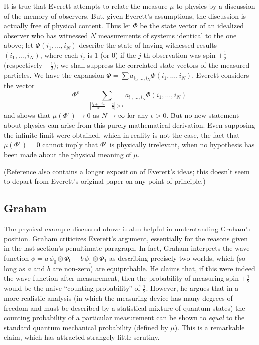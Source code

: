 \documentclass[aps,pra,12pt]{revtex4}
\begin{document}
It is true that Everett attempts to relate the measure $\mu$ to physics by a
discussion of the memory of observers. 
But, given Everett's assumptions, the discussion
is actually free of physical content. 
Thus let $\Phi$ be the state vector of an idealized observer who has witnessed
$N$ measurements of systems identical to the one above; 
let $\Phi (i_1 , \ldots , i_N )$ describe the state of having witnessed
results $(i_1 , \ldots , i_N )$, where each $i_j$ is $1$ (or $0$) if the 
$j$-th observation was spin $+\frac{1}{2}$ (respectively 
$-\frac{1}{2}$); we shall 
suppress the correlated state vectors of the measured particles. 
We have the expansion 
$\Phi = \sum  a_{i_1 , \ldots , i_N}\Phi (i_1 , \ldots , i_N )$.
Everett considers the vector
\begin{equation}
\Phi^{\epsilon} = 
\sum_{| \frac{i_1 + \ldots i_N}{N} - \frac{2}{3} | > \epsilon}
 a_{i_1 , \ldots , i_N}\Phi (i_1 , \ldots , i_N )
\end{equation}
and shows that $\mu(\Phi^{\epsilon}) \rightarrow 0$ as $N \rightarrow \infty$
for any $\epsilon > 0$. 
But no new statement about physics can arise from this purely mathematical
derivation.  
Even supposing the infinite limit were obtained, which in reality is not
the case, the fact that
$\mu (\Phi^{\epsilon})=0 $ cannot imply that $\Phi^{\epsilon}$ is
physically irrelevant, when no hypothesis has been made about the
physical meaning of $\mu$.

(Reference \cite{mwbook} also contains a
longer exposition \cite{ev2} of Everett's ideas; this doesn't seem to depart 
from Everett's original paper on any point of principle.) 

\subsection{Graham}

The physical example discussed above is also helpful in understanding 
Graham's position.  
Graham criticizes Everett's argument, essentially for the reasons given in
the last section's penultimate paragraph. 
In fact, Graham interprets the wave function 
$\phi = a \, \phi_0 \otimes \Phi_0 + b \, \phi_1 \otimes \Phi_1$
as describing precisely two worlds, which (so long as $a$ and $b$ are non-zero)
are equiprobable. 
He claims that, if this were indeed the wave function after measurement,
then the probability of measuring 
spin $\pm \frac{1}{2}$ would be the naive ``counting probability'' of 
$\frac{1}{2}$.
However, he argues that in a more realistic analysis (in which the measuring 
device has many degrees of freedom and must be described by a statistical
mixture of quantum states) the counting probability of a particular
measurement can be shown to {\em equal} to the standard quantum mechanical
probability (defined by $\mu$). 
This is a remarkable claim, which has attracted strangely little scrutiny. 
\end{document}
